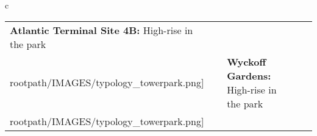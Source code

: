 \begin{table}[H]
        \begin{tabular}{c}
        \begin{tabular}{m{1.25in} m{2in} m{.1in} m{1.25in} m{2in}}
\textbf{Atlantic Terminal Site 4B:} {High-rise in the park} & \texttt{[image: \\rootpath/IMAGES/typology\_towerpark.png]} & & \textbf{Wyckoff Gardens:} {High-rise in the park} & \texttt{[image: \\rootpath/IMAGES/typology\_towerpark.png]}
\end{tabular}\end{tabular}
        \end{table}